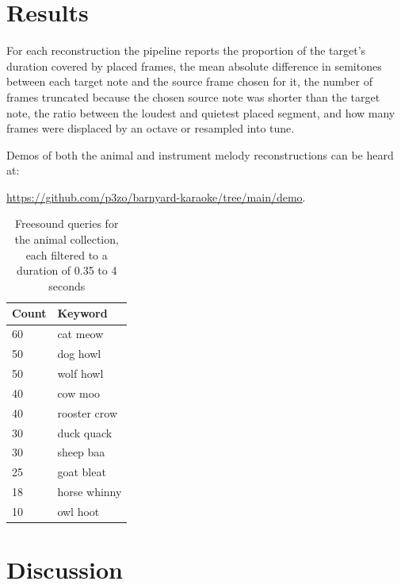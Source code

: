\documentclass{article}
\begin{document}
\section{Results}

For each reconstruction the pipeline reports the proportion of the target's duration covered by placed frames, the mean absolute difference in semitones between each target note and the source frame chosen for it, the number of frames truncated because the chosen source note was shorter than the target note, the ratio between the loudest and quietest placed segment, and how many frames were displaced by an octave or resampled into tune.

Demos of both the animal and instrument melody reconstructions can be heard at:
	\begin{center}
		\url{https://github.com/p3zo/barnyard-karaoke/tree/main/demo}.
	\end{center}

\begin{table}
    \begin{center}
    \begin{tabular}{@{}ll@{}}
        \toprule
        Count & Keyword \\
        \midrule
        60 & cat meow \\
        50 & dog howl \\
        50 & wolf howl \\
        40 & cow moo \\
        40 & rooster crow \\
        30 & duck quack \\
        30 & sheep baa \\
        25 & goat bleat \\
        18 & horse whinny \\
        10 & owl hoot \\
        \bottomrule
    \end{tabular}
    \end{center}
    \caption{Freesound queries for the animal collection, each filtered to a duration of 0.35 to 4 seconds}
    \label{tab:source-collection-queries}
\end{table}

\section{Discussion}
\end{document}
